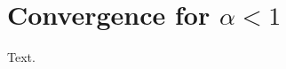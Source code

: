 \documentclass{article}
\begin{document}
\section{Convergence for $\alpha < 1$}
Text.
\end{document}
